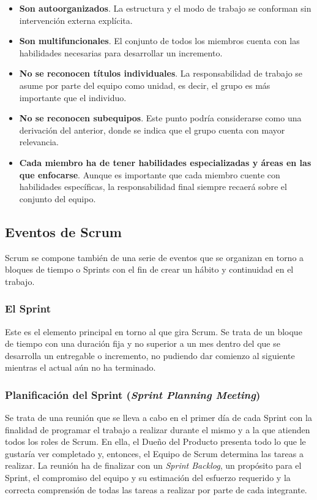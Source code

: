 \begin{itemize}
    \item \textbf{Son autoorganizados}. La estructura y el modo de trabajo se conforman sin intervención externa explícita.
    \item \textbf{Son multifuncionales}. El conjunto de todos los miembros cuenta con las habilidades necesarias para desarrollar un incremento.
    \item \textbf{No se reconocen títulos individuales}. La responsabilidad de trabajo se asume por parte del equipo como unidad, es decir, el grupo es más importante que el individuo.
    \item \textbf{No se reconocen subequipos}. Este punto podría considerarse como una derivación del anterior, donde se indica que el grupo cuenta con mayor relevancia.
    \item \textbf{Cada miembro ha de tener habilidades especializadas y áreas en las que enfocarse}. Aunque es importante que cada miembro cuente con habilidades específicas, la responsabilidad final siempre recaerá sobre el conjunto del equipo.
\end{itemize}

\subsection{Eventos de Scrum}
Scrum se compone también de una serie de eventos que  se organizan en torno a bloques de tiempo o Sprints con el fin de crear un hábito y continuidad en el trabajo.

\subsubsection{El Sprint}
Este es el elemento principal en torno al que gira Scrum. Se trata de un bloque de tiempo con una duración fija y no superior a un mes dentro del que se desarrolla un entregable o incremento, no pudiendo dar comienzo al siguiente mientras el actual aún no ha terminado.


\subsubsection{Planificación del Sprint (\textit{Sprint Planning Meeting})}
Se trata de una reunión que se lleva a cabo en el primer día de cada Sprint con la finalidad de programar el trabajo a realizar durante el mismo y a la que atienden todos los roles de Scrum. En ella, el Dueño del Producto presenta todo lo que le gustaría ver completado y, entonces, el Equipo de Scrum determina las tareas a realizar. La reunión ha de finalizar con un \textit{Sprint Backlog}, un propósito para el Sprint, el compromiso del equipo y su estimación del esfuerzo requerido y la correcta comprensión de todas las tareas a realizar por parte de cada integrante.

